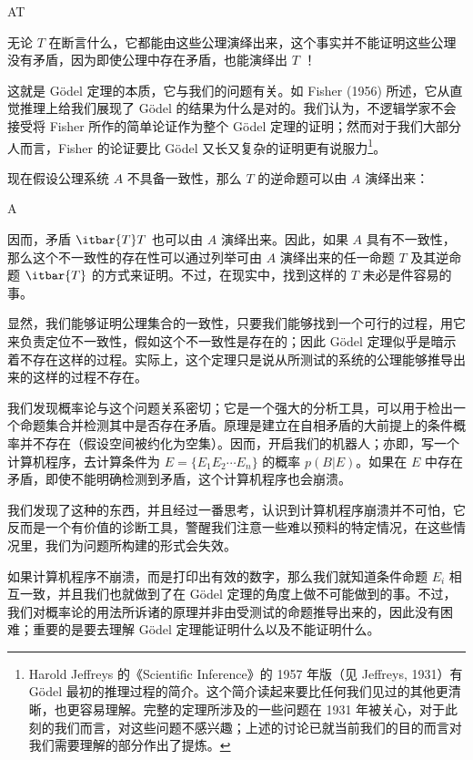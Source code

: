 \placeformula[2-102]
\startformula
A\Rightarrow T
\stopformula

无论 $T$ 在断言什么，它都能由这些公理演绎出来，这个事实并不能证明这些公理没有矛盾，因为即使公理中存在矛盾，也能演绎出 $T$ ！

这就是 G\"odel 定理的本质，它与我们的问题有关。如 Fisher (1956) 所述，它从直觉推理上给我们展现了 G\"odel 的结果为什么是对的。我们认为，不逻辑学家不会接受将 Fisher 所作的简单论证作为整个 G\"odel 定理的证明；然而对于我们大部分人而言，Fisher 的论证要比 G\"odel 又长又复杂的证明更有说服力\footnote{Harold Jeffreys 的《Scientific Inference》的 1957 年版（见 Jeffreys, 1931）有 G\"odel 最初的推理过程的简介。这个简介读起来要比任何我们见过的其他更清晰，也更容易理解。完整的定理所涉及的一些问题在 1931 年被关心，对于此刻的我们而言，对这些问题不感兴趣；上述的讨论已就当前我们的目的而言对我们需要理解的部分作出了提炼。}。

现在假设公理系统 $A$ 不具备一致性，那么 $T$ 的逆命题可以由 $A$ 演绎出来：

\placeformula[2-103]
\startformula
A\Rightarrow {}
\stopformula

因而，矛盾 $\itbar{T}T$ 也可以由 $A$ 演绎出来。因此，如果 $A$ 具有不一致性，那么这个不一致性的存在性可以通过列举可由 $A$ 演绎出来的任一命题 $T$ 及其逆命题 $\itbar{T}$ 的方式来证明。不过，在现实中，找到这样的 $T$ 未必是件容易的事。

显然，我们能够证明公理集合的一致性，只要我们能够找到一个可行的过程，用它来负责定位不一致性，假如这个不一致性是存在的；因此 G\"odel 定理似乎是暗示着不存在这样的过程。实际上，这个定理只是说从所测试的系统的公理能够推导出来的这样的过程不存在。

我们发现概率论与这个问题关系密切；它是一个强大的分析工具，可以用于检出一个命题集合并检测其中是否存在矛盾。原理是建立在自相矛盾的大前提上的条件概率并不存在（假设空间被约化为空集）。因而，开启我们的机器人；亦即，写一个计算机程序，去计算条件为 $E = \{E_1E_2\cdots E_n\}$ 的概率 $p(B|E)$。如果在 $E$ 中存在矛盾，即使不能明确检测到矛盾，这个计算机程序也会崩溃。

我们发现了这种的东西，并且经过一番思考，认识到计算机程序崩溃并不可怕，它反而是一个有价值的诊断工具，警醒我们注意一些难以预料的特定情况，在这些情况里，我们为问题所构建的形式会失效。

如果计算机程序不崩溃，而是打印出有效的数字，那么我们就知道条件命题 $E_i$ 相互一致，并且我们也就做到了在 G\"odel 定理的角度上做不可能做到的事。不过，我们对概率论的用法所诉诸的原理并非由受测试的命题推导出来的，因此没有困难；重要的是要去理解 G\"odel 定理能证明什么以及不能证明什么。

